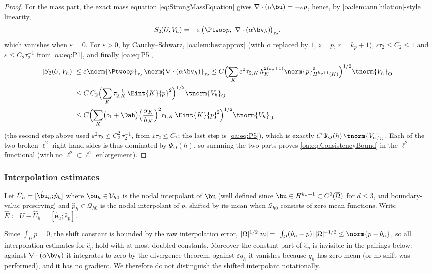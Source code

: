 \begin{proof}
For the mass part, the exact mass equation \cref{eq:StrongMassEquation} gives
$\nabla\cdot(\alpha\bu) = -\varepsilon p$, hence, by \cref{oa:lem:annihilation}-style
linearity,
\[
  S_2(U, V_h) = -\varepsilon\,\bigl( \Ptwoo p,\ \nabla\cdot(\alpha\bv_h)
  \bigr)_{\tau_2},
\]
which vanishes when $\varepsilon = 0$. For $\varepsilon > 0$, by Cauchy--Schwarz,
\cref{oa:lem:bestapprox} (with $\alpha$ replaced by $1$, $z = p$, $r = k_p+1$),
$\varepsilon\tau_{2} \le C_2 \le 1$ and $\varepsilon \le C_2\tau_2^{-1}$ from
\cref{oa:eq:P1}, and finally \cref{oa:eq:P5},
\begin{align*}
  |S_2(U, V_h)|
  &\le \varepsilon \norm{\Ptwoo p}_{\tau_2}\,\norm{\nabla\cdot(\alpha\bv_h)}_{\tau_2}
  \le C \Bigl( \sum_K \varepsilon^2 \tau_{2,K}\, h_K^{2(k_p+1)}
  \norm{p}_{H^{k_p+1}(K)}^2 \Bigr)^{1/2} \tnorm{V_h}_{\mathrm{O}}\\
  &\le C\,C_2 \Bigl( \sum_K \tau_{2,K}^{-1}\, \Eint{K}{p}^2 \Bigr)^{1/2}
  \tnorm{V_h}_{\mathrm{O}}\\
  &\le C \Bigl( \sum_K \bigl(c_1 + \Dah\bigr)
  \Bigl(\frac{\alpha_K}{h_K}\Bigr)^{2}\tau_{1,K}\,\Eint{K}{p}^2 \Bigr)^{1/2}
  \tnorm{V_h}_{\mathrm{O}}
\end{align*}
(the second step above used $\varepsilon^2\tau_2 \le C_2^2\,\tau_2^{-1}$, from $\varepsilon\tau_2\le C_2$;
the last step is \cref{oa:eq:P5}),
which is exactly $C\,\Psi_{\mathrm O}(h)\,\tnorm{V_h}_{\mathrm{O}}$. Each of the two broken $\ell^2$
right-hand sides is thus dominated by $\Psi_{\mathrm O}(h)$, so summing the two parts
proves \cref{oa:eq:ConsistencyBound} in the $\ell^2$ functional (with no $\ell^2\subset\ell^1$
enlargement).
\end{proof}

\subsubsection{Interpolation estimates}

Let $\hat U_h = [\hat\bu_h; \hat p_h]$ where $\hat\bu_h \in \mathcal{V}_{h0}$ is the nodal
interpolant of $\bu$ (well defined since $\bu \in H^{k_u+1} \subset
C^0(\overline\Omega)$ for $d\le 3$, and boundary-value preserving) and
$\hat p_h \in \mathcal{Q}_{h0}$ is the nodal interpolant of $p$, shifted by its mean when
$\mathcal{Q}_{h0}$ consists of zero-mean functions. Write
$\hat E \coloneqq U - \hat U_h = [\hat{\boldsymbol e}_u; \hat e_p]$.

\begin{remark}
\label{oa:rem:meanshift}
Since $\int_\Omega p = 0$, the shift constant is bounded by the raw interpolation
error, $|\Omega|^{1/2}|m| = |\int_\Omega (\hat p_h - p)|\,|\Omega|^{-1/2}
\le \norm{p - \hat p_h}$, so all interpolation estimates for $\hat e_p$ hold with at
most doubled constants. Moreover the constant part of $\hat e_p$ is invisible in the
pairings below: against $\nabla\cdot(\alpha\bv_h)$ it integrates to zero by the
divergence theorem, against $\varepsilon q_h$ it vanishes because $q_h$ has zero mean
(or no shift was performed), and it has no gradient. We therefore do not distinguish
the shifted interpolant notationally.
\end{remark}

